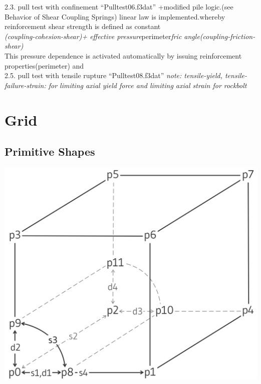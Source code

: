 \documentclass[a4paper, nobind]{templates/ociamthesis}
\begin{document}
2.3. pull test with confinement ``Pulltest06.f3dat''
+modified pile logic.(see Behavior of Shear Coupling Springs) linear law is implemented.whereby reinforcement shear strength is defined as constant\\
\emph{(coupling-cohesion-shear)+ effective pressure}perimeter\emph{fric angle(coupling-friction-shear)}\\
This pressure dependence is activated automatically by issuing reinforcement properties(perimeter) and\\

2.5. pull test with tensile rupture ``Pulltest08.f3dat''
\emph{note: tensile-yield, tensile-failure-strain: for limiting axial yield force and limiting axial strain for rockbolt}

\newpage

\hypertarget{grid}{%
\chapter{Grid}\label{grid}}

\hypertarget{primitive-shapes}{%
\section{Primitive Shapes}\label{primitive-shapes}}

\includegraphics[width=1\linewidth]{myfigureeeeee/radial-cylinder}
\end{document}
